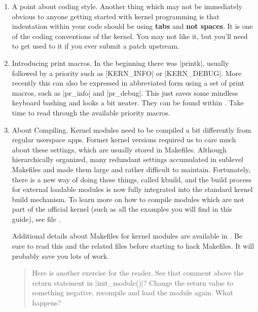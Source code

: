 \documentclass[10pt, oneside]{book}
\begin{document}
\begin{enumerate}
  \item A point about coding style.
        Another thing which may not be immediately obvious to anyone getting started with kernel programming is that indentation within your code should be using \textbf{tabs} and \textbf{not spaces}.
        It is one of the coding conventions of the kernel.
        You may not like it, but you'll need to get used to it if you ever submit a patch upstream.

  \item Introducing print macros.
  \label{sec:printk}
        In the beginning there was \cpp|printk|, usually followed by a priority such as \cpp|KERN_INFO| or \cpp|KERN_DEBUG|.
        More recently this can also be expressed in abbreviated form using a set of print macros, such as \cpp|pr_info| and \cpp|pr_debug|.
        This just saves some mindless keyboard bashing and looks a bit neater.
        They can be found within .
        Take time to read through the available priority macros.

  \item About Compiling.
        Kernel modules need to be compiled a bit differently from regular userspace apps.
        Former kernel versions required us to care much about these settings, which are usually stored in Makefiles.
        Although hierarchically organized, many redundant settings accumulated in sublevel Makefiles and made them large and rather difficult to maintain.
        Fortunately, there is a new way of doing these things, called kbuild, and the build process for external loadable modules is now fully integrated into the standard kernel build mechanism.
        To learn more on how to compile modules which are not part of the official kernel (such as all the examples you will find in this guide), see file .

        Additional details about Makefiles for kernel modules are available in . Be sure to read this and the related files before starting to hack Makefiles. It will probably save you lots of work.

\begin{quote}
Here is another exercise for the reader.
See that comment above the return statement in \cpp|init_module()|?
Change the return value to something negative, recompile and load the module again.
What happens?
\end{quote}
\end{enumerate}
\end{document}
